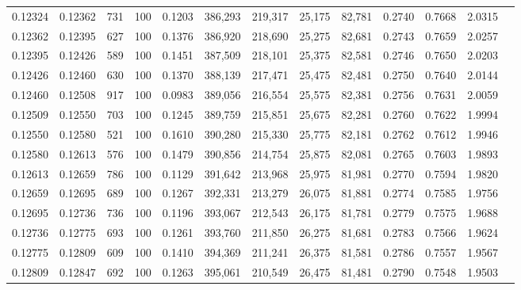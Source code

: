 \begin{tabular}{rrrrrrrrrrrrr}
0.12324 & 0.12362 &   731 & 100 &                                     0.1203 & 386,293 & 219,317 &  25,175 &  82,781 & 0.2740 & 0.7668 & 2.0315 \\
0.12362 & 0.12395 &   627 & 100 &                                     0.1376 & 386,920 & 218,690 &  25,275 &  82,681 & 0.2743 & 0.7659 & 2.0257 \\
0.12395 & 0.12426 &   589 & 100 &                                     0.1451 & 387,509 & 218,101 &  25,375 &  82,581 & 0.2746 & 0.7650 & 2.0203 \\
0.12426 & 0.12460 &   630 & 100 &                                     0.1370 & 388,139 & 217,471 &  25,475 &  82,481 & 0.2750 & 0.7640 & 2.0144 \\
0.12460 & 0.12508 &   917 & 100 &                                     0.0983 & 389,056 & 216,554 &  25,575 &  82,381 & 0.2756 & 0.7631 & 2.0059 \\
0.12509 & 0.12550 &   703 & 100 &                                     0.1245 & 389,759 & 215,851 &  25,675 &  82,281 & 0.2760 & 0.7622 & 1.9994 \\
0.12550 & 0.12580 &   521 & 100 &                                     0.1610 & 390,280 & 215,330 &  25,775 &  82,181 & 0.2762 & 0.7612 & 1.9946 \\
0.12580 & 0.12613 &   576 & 100 &                                     0.1479 & 390,856 & 214,754 &  25,875 &  82,081 & 0.2765 & 0.7603 & 1.9893 \\
0.12613 & 0.12659 &   786 & 100 &                                     0.1129 & 391,642 & 213,968 &  25,975 &  81,981 & 0.2770 & 0.7594 & 1.9820 \\
0.12659 & 0.12695 &   689 & 100 &                                     0.1267 & 392,331 & 213,279 &  26,075 &  81,881 & 0.2774 & 0.7585 & 1.9756 \\
0.12695 & 0.12736 &   736 & 100 &                                     0.1196 & 393,067 & 212,543 &  26,175 &  81,781 & 0.2779 & 0.7575 & 1.9688 \\
0.12736 & 0.12775 &   693 & 100 &                                     0.1261 & 393,760 & 211,850 &  26,275 &  81,681 & 0.2783 & 0.7566 & 1.9624 \\
0.12775 & 0.12809 &   609 & 100 &                                     0.1410 & 394,369 & 211,241 &  26,375 &  81,581 & 0.2786 & 0.7557 & 1.9567 \\
0.12809 & 0.12847 &   692 & 100 &                                     0.1263 & 395,061 & 210,549 &  26,475 &  81,481 & 0.2790 & 0.7548 & 1.9503 \\

\end{tabular}

